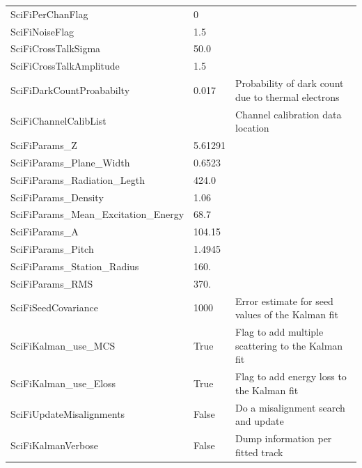 \begin{tabular}{| l | l | p{8cm} |}
  SciFiPerChanFlag & 0 & \\
  SciFiNoiseFlag & 1.5 & \\
  SciFiCrossTalkSigma & 50.0 & \\
  SciFiCrossTalkAmplitude & 1.5 & \\
  SciFiDarkCountProababilty & 0.017 & Probability of dark count due to thermal electrons \\
  SciFiChannelCalibList & & Channel calibration data location \\
  SciFiParams\_Z & 5.61291 & \\
  SciFiParams\_Plane\_Width & 0.6523 & \\
  SciFiParams\_Radiation\_Legth & 424.0 & \\
  SciFiParams\_Density & 1.06 & \\
  SciFiParams\_Mean\_Excitation\_Energy & 68.7 & \\
  SciFiParams\_A & 104.15 & \\
  SciFiParams\_Pitch & 1.4945 & \\
  SciFiParams\_Station\_Radius & 160. & \\
  SciFiParams\_RMS & 370. & \\
  SciFiSeedCovariance & 1000 & Error estimate for seed values of the Kalman fit \\
  SciFiKalman\_use\_MCS & True & Flag to add multiple scattering to the Kalman fit \\
  SciFiKalman\_use\_Eloss & True & Flag to add energy loss to the Kalman fit \\
  SciFiUpdateMisalignments & False & Do a misalignment search and update \\
  SciFiKalmanVerbose & False & Dump information per fitted track \\
  \hline  
\end{tabular}
\renewcommand{\arraystretch}{1.0}
